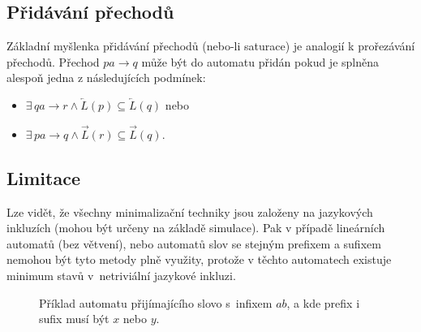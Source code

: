     \subsection{Přidávání přechodů}
        Základní myšlenka přidávání přechodů (nebo-li saturace) je analogií k prořezávání přechodů. Přechod $pa \rightarrow q$ může být do automatu přidán pokud je splněna alespoň jedna z následujících podmínek:
        \begin{itemize}
            \item $\exists\, qa\rightarrow r \land \overleftarrow{L}(p) \subseteq \overleftarrow{L}(q)$ nebo
            \item $\exists\, pa\rightarrow q \land \overrightarrow{L}(r) \subseteq \overrightarrow{L}(q)$.
        \end{itemize}

    \subsection{Limitace}
        Lze vidět, že všechny minimalizační techniky jsou založeny na jazykových inkluzích (mohou být určeny na základě simulace). Pak v případě lineárních automatů (bez větvení), nebo automatů slov se stejným prefixem a sufixem nemohou být tyto metody plně využity, protože v těchto automatech existuje minimum stavů v~netriviální jazykové inkluzi.

        \begin{figure}[h]
            \centering
            \captionsetup{justification=justified}
            \caption{Příklad automatu přijímajícího slovo s~infixem $ab$, a kde prefix i sufix musí být $x$ nebo $y$.}
            \label{sufprefAtm}
          \end{figure}

